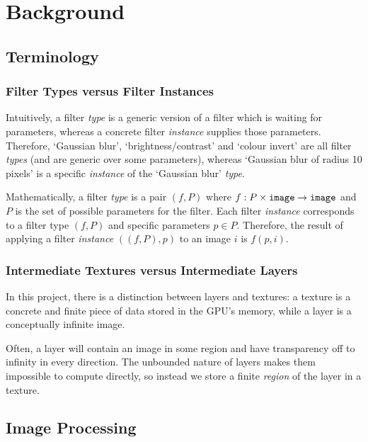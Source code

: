 \documentclass[12pt]{article}
\begin{document}
\pagebreak

\section{Background}

\subsection{Terminology}

\subsubsection{Filter Types versus Filter Instances}

Intuitively, a filter \emph{type} is a generic version of a filter which is waiting for parameters,
whereas a concrete filter \emph{instance} supplies those parameters.  Therefore, `Gaussian blur',
`brightness/contrast' and `colour invert' are all filter \emph{types} (and are generic over some
parameters), whereas `Gaussian blur of radius 10 pixels' is a specific \emph{instance} of the
`Gaussian blur' \emph{type}.

Mathematically, a filter \emph{type} is a pair $(f, P)$ where $f: P \times \verb|image| \rightarrow
\verb|image|$ and $P$ is the set of possible parameters for the filter.  Each filter \emph{instance}
corresponds to a filter type $(f, P)$ and specific parameters $p \in P$.  Therefore, the result of
applying a filter \emph{instance} $((f, P), p)$ to an image $i$ is $f(p, i)$.

\subsubsection{Intermediate Textures versus Intermediate Layers}

In this project, there is a distinction between layers and textures: a texture is a concrete and
finite piece of data stored in the GPU's memory, while a layer is a conceptually infinite image.

Often, a layer will contain an image in some region and have transparency off to infinity in every
direction.  The unbounded nature of layers makes them impossible to compute directly, so instead we
store a finite \emph{region} of the layer in a texture.

\subsection{Image Processing}
\end{document}

